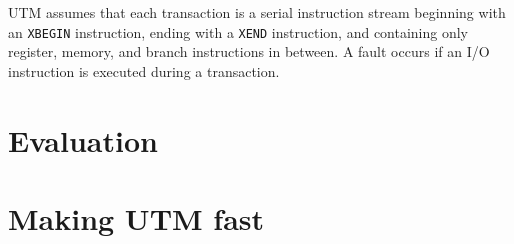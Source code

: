 UTM assumes that each transaction is a serial instruction stream
beginning with an \texttt{XBEGIN} instruction, ending with a
\texttt{XEND} instruction, and containing only register, memory, and
branch instructions in between.  A fault occurs if an I/O instruction
is executed during a transaction.





\section{Evaluation}

\section{Making UTM fast}

